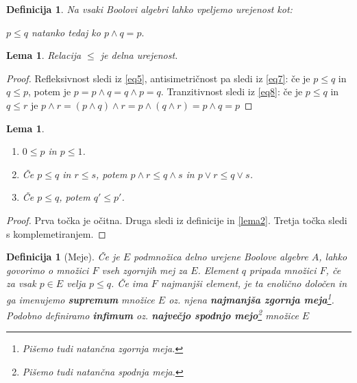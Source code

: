 \documentclass{amsart}
\newtheorem{lema}[izrek]{Lema}
\newtheorem{definicija}[izrek]{Definicija}
\begin{document}
\begin{definicija}
    Na vsaki Boolovi algebri lahko vpeljemo urejenost kot:
    \begin{center}
        \(p \leq q \) natanko tedaj ko \(p \wedge q  = p.\)
    \end{center}
\end{definicija}

\begin{lema}
    Relacija \(\leq\) je delna urejenost.
\end{lema}

\begin{proof}
    Refleksivnost sledi iz \ref{eq5}, antisimetričnost pa sledi iz \ref{eq7}: če je \(p \leq q\) in \(q \leq p\), potem
    je \(p = p \wedge q = q \wedge p = q\). Tranzitivnost sledi iz \ref{eq8}:
    če je \(p \leq q\) in \(q \leq r\) je \(p\wedge r = \left(p \wedge q\right) \wedge r = p \wedge \left(q \wedge r\right) = p \wedge q = p\)
\end{proof}

\begin{lema}
    \label{lema3}
    \begin{enumerate}
        \item \(0 \leq p\) in \(p \leq 1\).
        \item Če \(p \leq q\) in \(r \leq s\), potem \(p \wedge r \leq q \wedge s\) in \(p \vee r \leq q \vee s\). \label{lema3.2}
        \item Če \(p \leq q\), potem \(q' \leq p'\).
    \end{enumerate}
\end{lema}

\begin{proof}
    Prva točka je očitna. Druga sledi iz definicije in \ref{lema2}. Tretja točka sledi s komplemetiranjem.

\end{proof}

\begin{definicija}[Meje]
    Če je $E$ podmnožica delno urejene Boolove algebre \(A\), lahko govorimo o množici \(F\) vseh zgornjih mej za \(E\).
    Element \(q\) pripada množici \(F\), če za vsak \(p \in E\) velja \(p \leq q\). Če ima \(F\) najmanjši element, je ta 
    enolično določen in ga imenujemo {\bf supremum} množice \(E\) oz. njena {\bf najmanjša zgornja meja}\footnote{Pišemo tudi natančna zgornja meja.}. Podobno 
    definiramo {\bf infimum} oz. {\bf največjo spodnjo mejo}\footnote{Pišemo tudi natančna spodnja meja.} množice \(E\)
\end{definicija}
\end{document}
